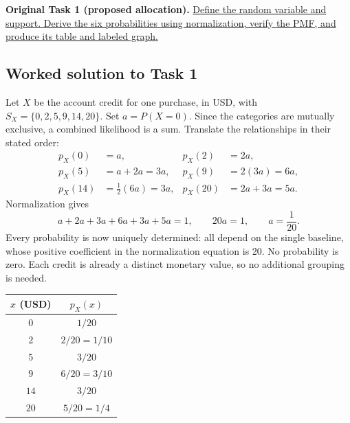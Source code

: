 \textbf{Original Task 1 (proposed allocation).} \hyperref[sol:q5t1]{Define the random variable and support. Derive the six probabilities using normalization, verify the PMF, and produce its table and labeled graph.} 


\subsection*{Worked solution to Task 1 }
\label{sol:q5t1}

Let $X$ be the account credit for one purchase, in USD, with $S_X=\{0,2,5,9,14,20\}$. Set $a=P(X=0)$. Since the categories are mutually exclusive, a combined likelihood is a sum. Translate the relationships in their stated order:
\begin{align*}
p_X(0)&=a,&p_X(2)&=2a,\\
p_X(5)&=a+2a=3a,&p_X(9)&=2(3a)=6a,\\
p_X(14)&=\tfrac12(6a)=3a,&p_X(20)&=2a+3a=5a.
\end{align*}
Normalization gives
\[
a+2a+3a+6a+3a+5a=1,\qquad 20a=1,\qquad a=\frac1{20}.
\]
Every probability is now uniquely determined: all depend on the single baseline, whose positive coefficient in the normalization equation is 20. No probability is zero. Each credit is already a distinct monetary value, so no additional grouping is needed.

\begin{center}
\begin{tabular}{cc}\toprule
$x$ (USD) & $p_X(x)$\\\midrule
$0$ & $1/20$\\
$2$ & $2/20=1/10$\\
$5$ & $3/20$\\
$9$ & $6/20=3/10$\\
$14$ & $3/20$\\
$20$ & $5/20=1/4$\\
\bottomrule\end{tabular}
\end{center}


\begin{center}\end{center}

